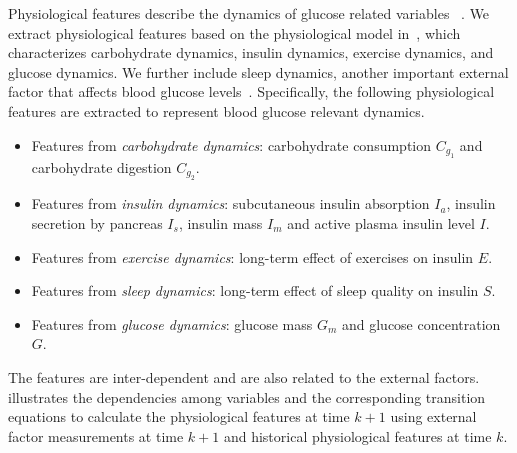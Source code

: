 Physiological features describe the dynamics of glucose related variables~\cite{bib:duke2010intelligent} \cite{bib:MAIHA14:Plis}.
We extract physiological features based on the physiological model in~\cite{bib:duke2010intelligent}, which characterizes carbohydrate dynamics, insulin dynamics, exercise dynamics, and glucose dynamics.
We further include sleep dynamics, another important external factor that affects blood glucose levels~\cite{bib:DRCP15:Iwasaki}.
Specifically, the following physiological features are extracted to represent blood glucose relevant dynamics.
\begin{itemize}
  \item
  Features from \emph{carbohydrate dynamics}:
  carbohydrate consumption $C_{g_1}$ and carbohydrate digestion $C_{g_2}$.
  \item
  Features from \emph{insulin dynamics}:
  subcutaneous insulin absorption $I_{a}$, insulin secretion by pancreas $I_{s}$, insulin mass $I_{m}$ and active plasma insulin level $I$.
  \item
  Features from \emph{exercise dynamics}:
  long-term effect of exercises on insulin $E$.
  \item
  Features from \emph{sleep dynamics}:
  long-term effect of sleep quality on insulin $S$.
  \item
  Features from \emph{glucose dynamics}:
  glucose mass $G_m$ and glucose concentration $G$.
\end{itemize}
The features are inter-dependent and are also related to the external factors.
 illustrates the dependencies among variables and the corresponding transition equations to calculate the physiological features at time $k+1$ using external factor measurements at time $k+1$ and historical physiological features at time $k$.

